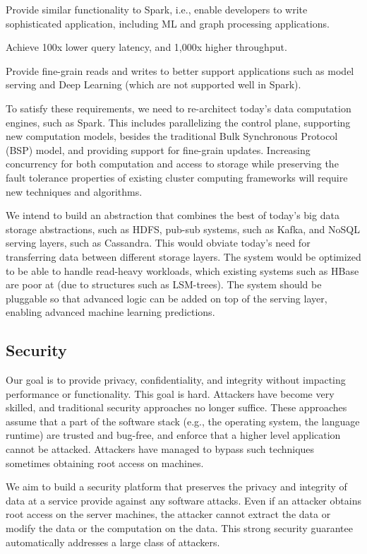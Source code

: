 \bi
\item Provide similar functionality to Spark, i.e., enable developers to write sophisticated application, including ML and graph processing applications.
\item Achieve 100x lower query latency, and 1,000x higher throughput.
\item Provide fine-grain reads and writes to better support applications such as model serving and Deep Learning (which are not supported well in Spark).
\ei

To satisfy these requirements, we need to re-architect today's data computation engines, such as Spark. This includes parallelizing the control plane, supporting new computation models, besides the traditional Bulk Synchronous Protocol (BSP) model, and providing support for fine-grain updates. Increasing concurrency for both computation and access to storage while preserving the fault tolerance properties of existing cluster computing frameworks will require new techniques and algorithms.

We intend to build an abstraction that combines the best of today's big data storage abstractions, such as HDFS, pub-sub systems, such as Kafka, and NoSQL serving layers, such as Cassandra. This would obviate today's need for transferring data between different storage layers. The system would be optimized to be able to handle read-heavy workloads, which existing systems such as HBase are poor at (due to structures such as LSM-trees). The system should be pluggable so that advanced logic can be added on top of the serving layer, enabling advanced machine learning predictions. 

\subsection{Security} 

Our goal is to provide privacy, confidentiality, and integrity without impacting performance or functionality. This goal is hard. Attackers have become very skilled, and traditional security approaches no longer suffice. These approaches assume that a part of the software stack (e.g., the operating system, the language runtime) are trusted and bug-free, and enforce that a higher level application cannot be attacked. Attackers have managed to bypass such techniques sometimes obtaining root access on machines.

We aim to build a security platform that preserves the privacy and integrity of data at a service provide against any software attacks. Even if an attacker obtains root access on the server machines, the attacker cannot extract the data or modify the data or the computation on the data. This strong security guarantee automatically addresses a large class of attackers.

